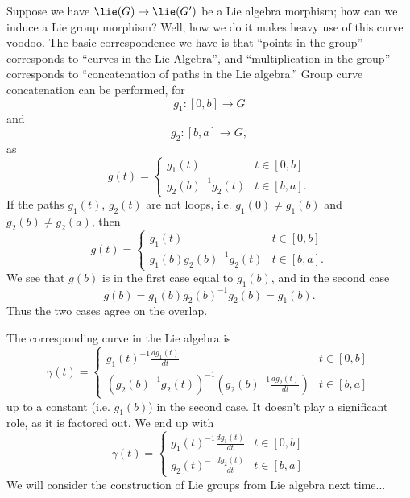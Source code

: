 
Suppose we have $\lie(G)\to\lie(G')$ be a Lie algebra morphism;
how can we induce a Lie group morphism? Well, how we do it makes
heavy use of this curve voodoo. The basic correspondence we have
is that ``points in the group'' corresponds to ``curves in the
Lie Algebra'', and ``multiplication in the group'' corresponds to
``concatenation of paths in the Lie algebra.'' Group curve
concatenation can be performed, for 
\begin{equation}
g_{1}:[0,b]\to G
\end{equation}
and
\begin{equation}
g_{2}:[b,a]\to G,
\end{equation}
as 
\begin{equation}
g(t)=\begin{cases} g_{1}(t) & t\in[0,b]\\
g_{2}(b)^{-1}g_{2}(t) & t\in[b,a].
\end{cases}
\end{equation}
If the paths $g_{1}(t)$, $g_{2}(t)$ are not loops,
i.e. $g_{1}(0)\not=g_{1}(b)$ and $g_{2}(b)\not=g_{2}(a)$, then
\begin{equation}
g(t)=\begin{cases} g_{1}(t) & t\in[0,b]\\
g_{1}(b)g_{2}(b)^{-1}g_{2}(t) & t\in[b,a].
\end{cases}
\end{equation}
We see that $g(b)$ is in the first case equal to $g_{1}(b)$, and
in the second case
\begin{equation}
g(b) = g_{1}(b)g_{2}(b)^{-1}g_{2}(b) = g_{1}(b).
\end{equation}
Thus the two cases agree on the overlap.

The corresponding curve in the Lie algebra is
\begin{equation}
\gamma(t) = \begin{cases}\displaystyle
g_{1}(t)^{-1}\frac{dg_{1}(t)}{dt} & t\in[0,b]\\
\displaystyle (g_{2}(b)^{-1}g_{2}(t))^{-1}\left(g_{2}(b)^{-1}\frac{dg_{2}(t)}{dt}\right)
& t\in[b,a]
\end{cases}
\end{equation}
up to a constant (i.e. $g_{1}(b)$) in the second case. It doesn't
play a significant role, as it is factored out. We end up with
\begin{equation}
\gamma(t) = \begin{cases}\displaystyle
g_{1}(t)^{-1}\frac{dg_{1}(t)}{dt} & t\in[0,b]\\
\displaystyle g_{2}(t)^{-1}\frac{dg_{2}(t)}{dt} & t\in[b,a]
\end{cases}
\end{equation}
We will consider the construction of Lie groups from Lie algebra
next time...

